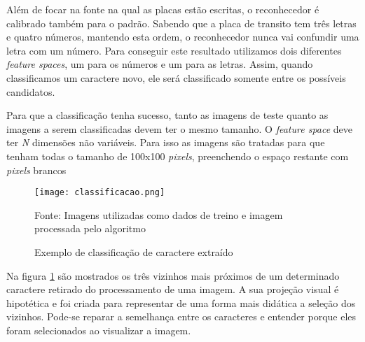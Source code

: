 Além de focar na fonte na qual as placas estão escritas, o reconhecedor é calibrado também para o padrão. Sabendo que a placa de transito tem três letras e quatro números, mantendo esta ordem, o reconhecedor nunca vai confundir uma letra com um número. Para conseguir este resultado utilizamos dois diferentes \emph{feature spaces}, um para os números e um para as letras. Assim, quando classificamos um caractere novo, ele será classificado somente entre os possíveis candidatos.

Para que a classificação tenha sucesso, tanto as imagens de teste quanto as imagens a serem classificadas devem ter o mesmo tamanho. O \emph{feature space} deve ter \emph{N} dimensões não variáveis. Para isso as imagens são tratadas para que tenham todas o tamanho de 100x100 \emph{pixels}, preenchendo o espaço restante com \emph{pixels} brancos

\begin{figure}[H]
	\centering
	\texttt{[image: classificacao.png]}
	\caption{Exemplo de classificação de caractere extraído}
Fonte: Imagens utilizadas como dados de treino e imagem processada pelo algoritmo
	\label{fig:classificacao}
\end{figure}

Na figura \ref{fig:classificacao} são mostrados os três vizinhos mais próximos de um determinado caractere retirado do processamento de uma imagem. A sua projeção visual é hipotética e foi criada para representar de uma forma mais didática a seleção dos vizinhos. Pode-se reparar a semelhança entre os caracteres e entender porque eles foram selecionados ao visualizar a imagem.